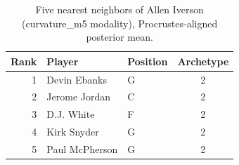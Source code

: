 \begin{table}[htbp]
  \centering\small
  \begin{tabular}{rllc}
    \toprule
    Rank & Player & Position & Archetype \\
    \midrule
    1 & Devin Ebanks & G & 2 \\
    2 & Jerome Jordan & C & 2 \\
    3 & D.J. White & F & 2 \\
    4 & Kirk Snyder & G & 2 \\
    5 & Paul McPherson & G & 2 \\
    \bottomrule
  \end{tabular}
  \caption{Five nearest neighbors of Allen Iverson (curvature_m5 modality), Procrustes-aligned posterior mean.}
  \label{tab:Allen_Iverson_neighbors_curvature_m5}
\end{table}

